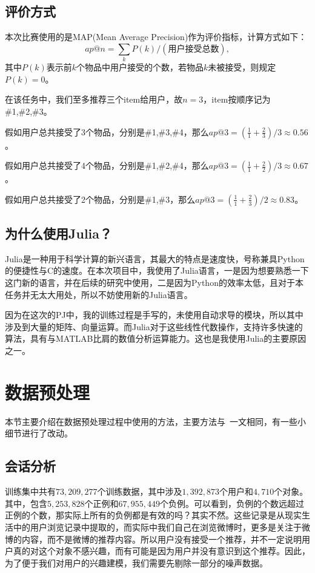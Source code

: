\documentclass[12pt]{article} %
\begin{document}
\begin{sloppypar}
\subsection{评价方式}
\label{sec:eval}

本次比赛使用的是MAP(Mean Average Precision)作为评价指标，计算方式如下：
\begin{equation}
ap@n = \sum_{k} P(k) / (\textit{用户接受总数}),
\end{equation}
其中$P(k)$表示前$k$个物品中用户接受的个数，若物品$k$未被接受，则规定$P(k)=0$。

在该任务中，我们至多推荐三个item给用户，故$n=3$，item按顺序记为\#1,\#2,\#3。

假如用户总共接受了3个物品，分别是\#1,\#3,\#4，那么$ap@3 = (\frac{1}{1} + \frac{2}{3}) / 3 \approx 0.56$。

假如用户总共接受了4个物品，分别是\#1,\#2,\#4，那么$ap@3 = (\frac{1}{1} + \frac{2}{2}) / 3 \approx 0.67$。 

假如用户总共接受了2个物品，分别是\#1,\#3，那么$ap@3 = (\frac{1}{1} + \frac{2}{3}) / 2 \approx 0.83$。 

\subsection{为什么使用Julia？}

Julia是一种用于科学计算的新兴语言，其最大的特点是速度快，号称兼具Python的便捷性与C的速度。在本次项目中，我使用了Julia语言，一是因为想要熟悉一下这门新的语言，并在后续的研究中使用，二是因为Python的效率太低，且对于本任务并无太大用处，所以不妨使用新的Julia语言。

因为在这次的PJ中，我的训练过程是手写的，未使用自动求导的模块，所以其中涉及到大量的矩阵、向量运算。而Julia对于这些线性代数操作，支持许多快速的算法，具有与MATLAB比肩的数值分析运算能力。这也是我使用Julia的主要原因之一。


\newpage
\section{数据预处理}

本节主要介绍在数据预处理过程中使用的方法，主要方法与~\cite{chen2012context}一文相同，有一些小细节进行了改动。

\subsection{会话分析}
\label{sec:session}

训练集中共有$73,209,277$个训练数据，其中涉及$1,392,873$个用户和$4,710$个对象。其中，包含$5,253,828$个正例和$67,955,449$个负例。可以看到，负例的个数远超过正例的个数，那实际上所有的负例都是有效的吗？其实不然。这些记录是从现实生活中的用户浏览记录中提取的，而实际中我们自己在浏览微博时，更多是关注于微博的内容，而不是微博的推荐内容。所以用户没有接受一个推荐，并不一定说明用户真的对这个对象不感兴趣，而有可能是因为用户并没有意识到这个推荐。因此，为了便于我们对用户的兴趣建模，我们需要先剔除一部分的噪声数据。


\end{sloppypar}
\end{document}
